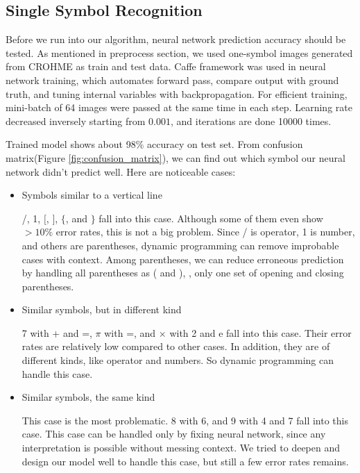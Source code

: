 \documentclass[10pt,twocolumn,letterpaper]{article}
\begin{document}
\subsection{Single Symbol Recognition}

Before we run into our algorithm, neural network prediction accuracy should be tested.
As mentioned in preprocess section, we used one-symbol images generated from CROHME as train and test data.
Caffe framework was used in neural network training, which automates forward pass, compare output with ground truth, and tuning internal variables with backpropagation.
For efficient training, mini-batch of 64 images were passed at the same time in each step.
Learning rate decreased inversely starting from $0.001$, and iterations are done 10000 times.

Trained model shows about 98\% accuracy on test set.
From confusion matrix(Figure \ref{fig:confusion_matrix}), we can find out which symbol our neural network didn't predict well.
Here are noticeable cases:
\begin{itemize}
\item Symbols similar to a vertical line

/, 1, $[$, $]$, $\{$, and $\}$ fall into this case.
Although some of them even show $>10\%$ error rates, this is not a big problem.
Since / is operator, 1 is number, and others are parentheses, dynamic programming can remove improbable cases with context.
Among parentheses, we can reduce erroneous prediction by handling all parentheses as ( and ), \ie, only one set of opening and closing parentheses.

\item Similar symbols, but in different kind

7 with + and =, $\pi$ with =, and $\times$ with 2 and e fall into this case.
Their error rates are relatively low compared to other cases.
In addition, they are of different kinds, like operator and numbers.
So dynamic programming can handle this case.

\item Similar symbols, the same kind

This case is the most problematic.
8 with 6, and 9 with 4 and 7 fall into this case.
This case can be handled only by fixing neural network, since any interpretation is possible without messing context.
We tried to deepen and design our model well to handle this case, but still a few error rates remains.

\end{itemize}
\end{document}
